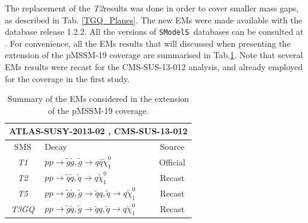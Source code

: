 \documentclass[preprint,number,sort&compress,twocolumn,3p]{elsstyarticle}
\newcommand{\SMO}{\texttt{SModelS\xspace}}
\newcommand{\TGQ}{ \textit{T3GQ}}
\newcommand{\Ttwo}{ \textit{T2}}
\newcommand{\Tfive}{ \textit{T5}}
\begin{document}
The replacement of the \Ttwo results was done in order to cover smaller mass gaps, as described in Tab. \ref{TGQ_Planes}. The new EMs were made available with the database release 1.2.2. All the versions of \SMO~databases can be consulted at \cite{databases}. For convenience, all the EMs results that will discussed when presenting the extension of the pMSSM-19 coverage are summarised in Tab.\ref{EMS}. Note that several EMs results were recast for the CMS-SUS-13-012 analysis, and already employed for the coverage in the first study. 
%
\begin{table}[!h]
	\begin{center}
		\renewcommand{\arraystretch}{1.3}
		\begin{tabular}{ c l c}  \toprule  \toprule 
			\multicolumn{3}{c}{ATLAS-SUSY-2013-02 , CMS-SUS-13-012} \\ \toprule 
			SMS & Decay & Source \\ \toprule
			\textit{T1} &  $ p p \rightarrow \tilde g \tilde g, \tilde g \rightarrow q \bar q \tilde \chi_1 ^0 $ & Official \\
            \Ttwo & $  p p \rightarrow \tilde q \tilde q , \tilde q \rightarrow q \tilde \chi_1 ^0 $&  Recast\\
            \Tfive & $p p \rightarrow \tilde g \tilde g , \tilde g \rightarrow \tilde q q,  \tilde q \rightarrow q \tilde \chi_1 ^0 $& Recast  \\
            \TGQ & $ p p \rightarrow \tilde g \tilde q, \tilde g \rightarrow \tilde q q,  \tilde q \rightarrow q \tilde \chi_1 ^0 $ & Recast \\  
            \bottomrule \bottomrule                                             
		\end{tabular}
	\end{center}
	\caption{Summary of the EMs considered in the extension of the pMSSM-19 coverage.}
	\label{EMS}
\end{table}
\end{document}
